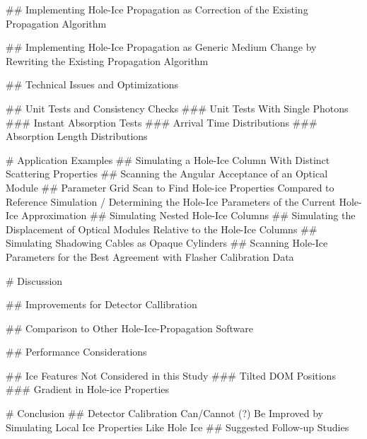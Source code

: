 
## Implementing Hole-Ice Propagation as Correction of the Existing Propagation Algorithm
\label{sec:algorithm_a}


## Implementing Hole-Ice Propagation as Generic Medium Change by Rewriting the Existing Propagation Algorithm
\label{sec:algorithm_b}

## Technical Issues and Optimizations

## Unit Tests and Consistency Checks
### Unit Tests With Single Photons
### Instant Absorption Tests
### Arrival Time Distributions
### Absorption Length Distributions

# Application Examples
## Simulating a Hole-Ice Column With Distinct Scattering Properties
## Scanning the Angular Acceptance of an Optical Module
## Parameter Grid Scan to Find Hole-ice Properties Compared to Reference Simulation / Determining the Hole-Ice Parameters of the Current Hole-Ice Approximation
## Simulating Nested Hole-Ice Columns
## Simulating the Displacement of Optical Modules Relative to the Hole-Ice Columns
## Simulating Shadowing Cables as Opaque Cylinders
## Scanning Hole-Ice Parameters for the Best Agreement with Flasher Calibration Data

# Discussion

## Improvements for Detector Callibration

## Comparison to Other Hole-Ice-Propagation Software

## Performance Considerations

## Ice Features Not Considered in this Study
### Tilted DOM Positions
### Gradient in Hole-ice Properties

# Conclusion
## Detector Calibration Can/Cannot (?) Be Improved by Simulating Local Ice Properties Like Hole Ice
## Suggested Follow-up Studies
